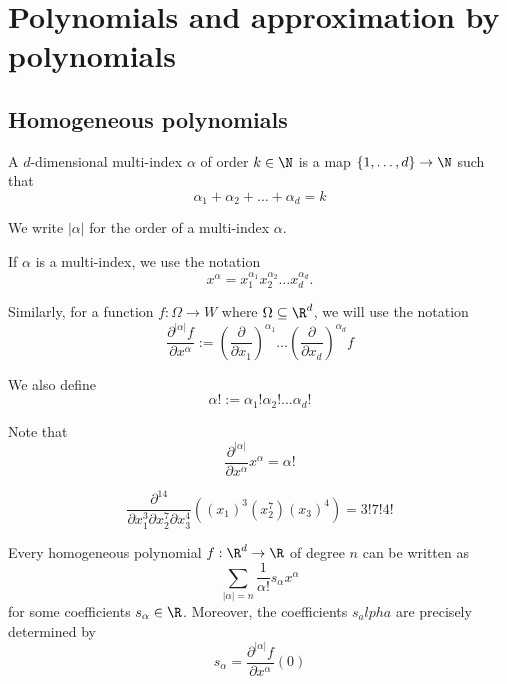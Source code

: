 \section{Polynomials and approximation by polynomials}

\subsection{Homogeneous polynomials}
\begin{definition}
    A $d$-dimensional multi-index $\alpha$ of order $k \in \N$ is a map
    $\{1,\dots,d\} \to \N$ such that
    $$\alpha_1 + \alpha_2 + \dots + \alpha_d = k$$

    We write $|\alpha|$ for the order of a multi-index $\alpha$.
\end{definition}

If $\alpha$ is a multi-index, we use the notation
$$x^\alpha = x_1^{\alpha_1}x_2^{\alpha_2}\dots x_d^{\alpha_d}.$$

Similarly, for a function $f: \Omega \to W$ where $\Omega \subseteq \R^d$, we will use the notation
$$\frac{\partial^{|\alpha|}f}{\partial x^\alpha}:=\left(\frac{\partial}{\partial x_1}\right)^{\alpha_1}\dots\left(\frac{\partial}{\partial x_d}\right)^{\alpha_d}f$$

We also define
$$\alpha!:=\alpha_1!\alpha_2!\dots\alpha_d!$$

Note that 
$$\frac{\partial^{|\alpha|}}{\partial x^\alpha}x^\alpha = \alpha!$$

\begin{example}
    $$\frac{\partial^{14}}{\partial x_1^3\partial x_2^7\partial x_3^4}((x_1)^3(x_2^7)(x_3)^4) = 3!7!4!$$
\end{example}

\begin{proposition}
    Every homogeneous polynomial $f: \R^d \to \R$ of degree $n$ can be written as
    $$\sum_{|\alpha|=n}\frac{1}{\alpha!}s_\alpha x^\alpha$$
    for some coefficients $s_\alpha \in \R$. Moreover, the coefficients $s_alpha$ are precisely determined by
    $$s_\alpha = \frac{\partial^{|\alpha|}f}{\partial x^\alpha}(0)$$
\end{proposition}

